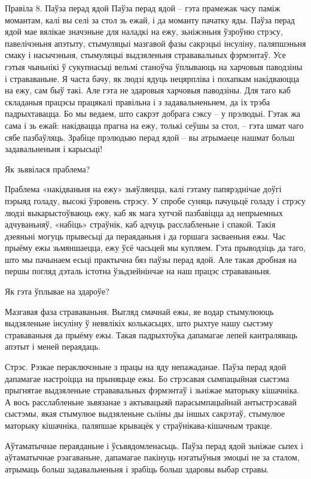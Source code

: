 Правіла 8. Паўза перад ядой
Паўза перад ядой – гэта прамежак часу паміж момантам, калі вы селі за стол зь ежай, і да моманту пачатку яды. Паўза перад ядой мае вялікае значэньне для наладкі на ежу, зьніжэньня ўзроўню стрэсу, павелічэньня апэтыту, стымуляцыі мазгавой фазы сакрэцыі інсуліну, паляпшэньня смаку і насычэньня, стымуляцыі выдзяленьня стрававальных фэрмэнтаў. Усе гэтыя чыньнікі ў сукупнасьці вельмі станоўча ўплываюць на харчовыя паводзіны і страваваньне. Я часта бачу, як людзі ядуць нецярпліва і похапкам накідваюцца на ежу, сам быў такі. Але гэта не здаровыя харчовыя паводзіны. Для таго каб складаныя працэсы працякалі правільна і з задавальненьнем, да іх трэба падрыхтавацца. Бо мы ведаем, што сакрэт добрага сэксу – у прэлюдыі. Гэтак жа сама і зь ежай: накідвацца прагна на ежу, толькі сеўшы за стол, – гэта шмат чаго сябе пазбаўляць. Зрабіце прэлюдыю перад ядой – вы атрымаеце нашмат больш задавальненьня і карысьці!

Як зьявілася праблема?

Праблема «накідваньня на ежу» зьяўляецца, калі гэтаму папярэднічае доўгі пэрыяд голаду, высокі ўзровень стрэсу. У спробе суняць пачуцьцё голаду і стрэсу людзі выкарыстоўваюць ежу, каб як мага хутчэй пазбавіцца ад непрыемных адчуваньняў, «набіць» страўнік, каб адчуць расслабленьне і спакой. Такія дзеяньні могуць прывесьці да пераяданьня і да горшага засваеньня ежы.
Час прыёму ежы зьмяншаецца, ежу ўсё часьцей мы купляем. Гэта прыводзіць да таго, што мы пачынаем есьці практычна бяз паўзы перад ядой. Але такая дробная на першы погляд дэталь істотна ўзьдзейнінчае на наш працэс страваваньня.

Як гэта ўплывае на здароўе?

Мазгавая фаза страваваньня.
Выгляд смачнай ежы, яе водар стымулююць выдзяленьне інсуліну ў невялікіх колькасьцях, што рыхтуе нашу сыстэму страваваньня да прыёму ежы. Такая падрыхтоўка дапамагае лепей кантраляваць апэтыт і меней пераядаць.

Стрэс.
Рэзкае пераключэньне з працы на яду непажаданае. Паўза перад ядой дапамагае настроіцца на прыняцьце ежы. Бо стрэсавая сымпацыйная сыстэма прыгнятае выдзяленьне стрававальных фэрмэнтаў і зьніжае маторыку кішачніка. А вось расслабленьне зьвязанае з актывацыяй парасымпацыйнай антыстрэсавай сыстэмы, якая стымулюе выдзяленьне сьліны ды іншых сакрэтаў, стымулюе маторыку кішачніка, паляпшае крывацёк у страўнікава-кішачным тракце.

Аўтаматычнае пераяданьне і ўсьвядомленасьць.
Паўза перад ядой зьніжае сьпех і аўтаматычнае рэагаваньне, дапамагае пакінуць нэгатыўныя эмоцыі не за сталом, атрымаць больш задавальненьня і зрабіць больш здаровы выбар стравы.

